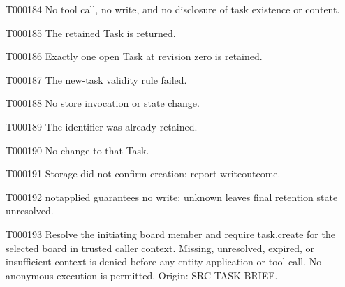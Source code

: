 \documentclass[11pt,a4paper]{article}
\begin{document}
\begin{atlasparagraph}{T000184}
No tool call, no write, and no disclosure of task existence or content.
\end{atlasparagraph}
\begin{atlasparagraph}{T000185}
The retained Task is returned.
\end{atlasparagraph}
\begin{atlasparagraph}{T000186}
Exactly one open Task at revision zero is retained.
\end{atlasparagraph}
\begin{atlasparagraph}{T000187}
The new-task validity rule failed.
\end{atlasparagraph}
\begin{atlasparagraph}{T000188}
No store invocation or state change.
\end{atlasparagraph}
\begin{atlasparagraph}{T000189}
The identifier was already retained.
\end{atlasparagraph}
\begin{atlasparagraph}{T000190}
No change to that Task.
\end{atlasparagraph}
\begin{atlasparagraph}{T000191}
Storage did not confirm creation; report write\AtlasCharUnderscore{}outcome.
\end{atlasparagraph}
\begin{atlasparagraph}{T000192}
not\AtlasCharUnderscore{}applied guarantees no write; unknown leaves final retention state unresolved.
\end{atlasparagraph}
\begin{atlasparagraph}{T000193}
Resolve the initiating board member and require task.create for the selected board in trusted caller context. Missing, unresolved, expired, or insufficient context is denied before any entity application or tool call. No anonymous execution is permitted. Origin: SRC-TASK-BRIEF.
\end{atlasparagraph}
\end{document}
